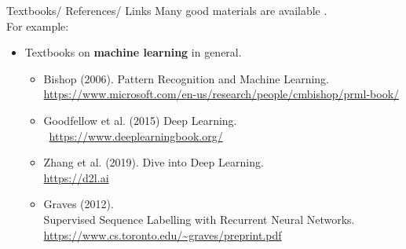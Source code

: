 \begin{frame}{Textbooks/ References/ Links}
\vspace{-3mm}
Many good materials are available .\\
\vsp
For example:
\vsp
\begin{itemize}
\item Textbooks on \textbf{machine learning} in general.
\vsp
\begin{itemize}
\item Bishop (2006). Pattern Recognition and Machine Learning. {\small \url{https://www.microsoft.com/en-us/research/people/cmbishop/prml-book/}}
\vspace{-2mm}
\item Goodfellow et al. (2015) Deep Learning. ~{\small \url{https://www.deeplearningbook.org/}}
\vsp
\item Zhang et al. (2019). Dive into Deep Learning.
\\{\small \url{https://d2l.ai}}
\vsp
\item Graves (2012).\\ Supervised Sequence Labelling with Recurrent Neural Networks. {\small \url{https://www.cs.toronto.edu/~graves/preprint.pdf}}
\end{itemize}
\end{itemize}
\end{frame}

